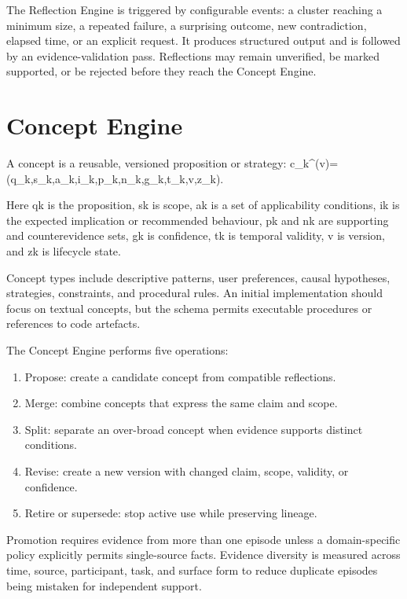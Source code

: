 \documentclass[
  english,
  a4paper,
  DIV=11,
  numbers=noendperiod]{scrreprt}
\providecommand{\tightlist}{%
  \setlength{\itemsep}{0pt}\setlength{\parskip}{0pt}}
\begin{document}
The Reflection Engine is triggered by configurable events: a cluster
reaching a minimum size, a repeated failure, a surprising outcome, new
contradiction, elapsed time, or an explicit request. It produces
structured output and is followed by an evidence-validation pass.
Reflections may remain unverified, be marked supported, or be rejected
before they reach the Concept Engine.

\section{Concept Engine}\label{concept-engine}

A concept is a reusable, versioned proposition or strategy:
c\_k\^{}(v)=(q\_k,s\_k,a\_k,i\_k,p\_k,n\_k,g\_k,t\_k,v,z\_k).

Here qk is the proposition, sk is scope, ak is a set of applicability
conditions, ik is the expected implication or recommended behaviour, pk
and nk are supporting and counterevidence sets, gk is confidence, tk is
temporal validity, v is version, and zk is lifecycle state.

Concept types include descriptive patterns, user preferences, causal
hypotheses, strategies, constraints, and procedural rules. An initial
implementation should focus on textual concepts, but the schema permits
executable procedures or references to code artefacts.

The Concept Engine performs five operations:

\begin{enumerate}
\def\labelenumi{\arabic{enumi}.}
\tightlist
\item
  Propose: create a candidate concept from compatible reflections.
\item
  Merge: combine concepts that express the same claim and scope.
\item
  Split: separate an over-broad concept when evidence supports distinct
  conditions.
\item
  Revise: create a new version with changed claim, scope, validity, or
  confidence.
\item
  Retire or supersede: stop active use while preserving lineage.
\end{enumerate}

Promotion requires evidence from more than one episode unless a
domain-specific policy explicitly permits single-source facts. Evidence
diversity is measured across time, source, participant, task, and
surface form to reduce duplicate episodes being mistaken for independent
support.
\end{document}
